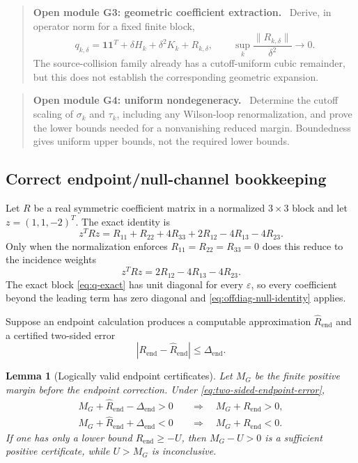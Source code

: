 \documentclass[11pt]{article}
\newtheorem{lemma}[theorem]{Lemma}
\newcommand{\one}{\mathbf 1}
\newcommand{\eps}{\varepsilon}
\newcommand{\norm}[1]{\lVert #1\rVert}
\newenvironment{openmodule}[1]
{\begin{quote}\color{red!55!black}\textbf{Open module #1.}\ }
{\end{quote}}
\begin{document}
\begin{openmodule}{G3: geometric coefficient extraction}
Derive, in operator norm for a fixed finite block,
\[
  q_{k,\delta}
  =\one\one^T+\delta H_k+\delta^2K_k+R_{k,\delta},
  \qquad
  \sup_k\frac{\norm{R_{k,\delta}}}{\delta^2}\longrightarrow0.
\]
The source-collision family already has a cutoff-uniform cubic remainder, but this does not establish the corresponding geometric expansion.
\end{openmodule}

\begin{openmodule}{G4: uniform nondegeneracy}
Determine the cutoff scaling of $\sigma_k$ and $\tau_k$, including any Wilson-loop renormalization, and prove the lower bounds needed for a nonvanishing reduced margin.  Boundedness gives uniform upper bounds, not the required lower bounds.
\end{openmodule}

\subsection{Correct endpoint/null-channel bookkeeping}

Let $R$ be a real symmetric coefficient matrix in a normalized $3\times3$ block and let $z=(1,1,-2)^T$.  The exact identity is
\begin{equation}
  z^TRz
  =R_{11}+R_{22}+4R_{33}
  +2R_{12}-4R_{13}-4R_{23}.
  \label{eq:full-null-identity}
\end{equation}
Only when the normalization enforces $R_{11}=R_{22}=R_{33}=0$ does this reduce to the incidence weights
\begin{equation}
  z^TRz=2R_{12}-4R_{13}-4R_{23}.
  \label{eq:offdiag-null-identity}
\end{equation}
The exact block \eqref{eq:q-exact} has unit diagonal for every $\eps$, so every coefficient beyond the leading term has zero diagonal and \eqref{eq:offdiag-null-identity} applies.

Suppose an endpoint calculation produces a computable approximation $\widehat R_{\mathrm{end}}$ and a certified two-sided error
\begin{equation}
  |R_{\mathrm{end}}-\widehat R_{\mathrm{end}}|\le\Delta_{\mathrm{end}}.
  \label{eq:two-sided-endpoint-error}
\end{equation}

\begin{lemma}[Logically valid endpoint certificates]
\label{lem:endpoint-certificates}
Let $M_G$ be the finite positive margin before the endpoint correction.  Under \eqref{eq:two-sided-endpoint-error},
\begin{align}
  M_G+\widehat R_{\mathrm{end}}-\Delta_{\mathrm{end}}>0
  &\quad\Longrightarrow\quad
  M_G+R_{\mathrm{end}}>0,
  \label{eq:endpoint-positive-certificate}\\
  M_G+\widehat R_{\mathrm{end}}+\Delta_{\mathrm{end}}<0
  &\quad\Longrightarrow\quad
  M_G+R_{\mathrm{end}}<0.
  \label{eq:endpoint-negative-certificate}
\end{align}
If one has only a lower bound $R_{\mathrm{end}}\ge-U$, then $M_G-U>0$ is a sufficient positive certificate, while $U>M_G$ is inconclusive.
\end{lemma}
\end{document}
